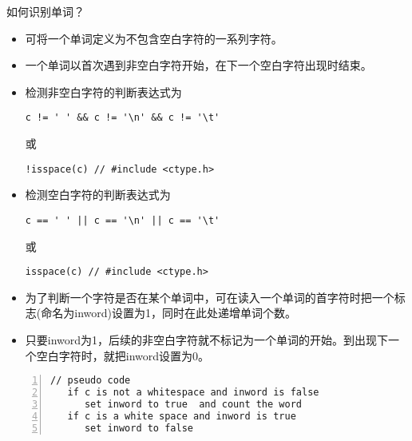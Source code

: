 \begin{frame}[fragile]\ft{\secname}
如何识别单词？ \pause \vspace{.1in}
\begin{itemize}
\item 可将一个单词定义为不包含空白字符的一系列字符。\\[0.15in]
\item 一个单词以首次遇到非空白字符开始，在下一个空白字符出现时结束。
\end{itemize}
\end{frame}

\begin{frame}[fragile]\ft{\secname}
\begin{itemize}
\item 检测非空白字符的判断表达式为
\begin{lstlisting}
c != ' ' && c != '\n' && c != '\t'
\end{lstlisting} 
或
\begin{lstlisting}
!isspace(c) // #include <ctype.h>
\end{lstlisting}\vspace{0.1in}

\item 检测空白字符的判断表达式为
\begin{lstlisting}
c == ' ' || c == '\n' || c == '\t'
\end{lstlisting}
或
\begin{lstlisting}
isspace(c) // #include <ctype.h>
\end{lstlisting}
\end{itemize}
\end{frame}

\begin{frame}[fragile]\ft{\secname}
\begin{itemize}
\item
为了判断一个字符是否在某个单词中，可在读入一个单词的首字符时把一个标志(命名为inword)设置为1，同时在此处递增单词个数。\\[.15in]
\item
只要inword为1，后续的非空白字符就不标记为一个单词的开始。到出现下一个空白字符时，就把inword设置为0。
\end{itemize}
\begin{lstlisting}[numbers=left]
// pseudo code
   if c is not a whitespace and inword is false
      set inword to true  and count the word
   if c is a white space and inword is true
      set inword to false   
\end{lstlisting}

\end{frame}

